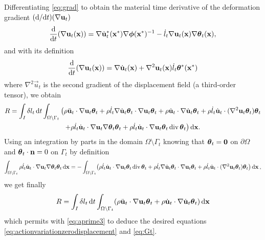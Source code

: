 Differentiating \eqref{eq:grad} to obtain the material time derivative of the deformation gradient $(\md/\md t)(\nabla\vec{u}_t)$
\[
\frac{\md}{\md t}(\nabla\vec{u}_t(\vec{x}))=\nabla\dot{\vec{u}}_t^*(\vec{x}^*)\nabla\philt(\vec{x}^*)^{-1}-\dot{l}_t\nabla\vec{u}_t(\vec{x})\nabla\vtheta_t(\vec{x}),
\]
and with its definition
\[
\frac{\md}{\md t}(\nabla\vec{u}_t(\vec{x}))=\nabla\dot{\vec{u}}_t(\vec{x})+\nabla^2\vec{u}_t(\vec{x})\dot{l}_t\vtheta^*(\vec{x}^*)
\]
where $\nabla^2\vec{u}_t$ is the second gradient of the displacement field (a third-order tensor), we obtain
\begin{multline*}
R=\int_I\delta l_t\D{t}\int_\domaint\big(\rho\ddot{\vec{u}}_t\cdot\nabla\vec{u}_t\vtheta_t+\rho\dot{l}_t\nabla\dot{\vec{u}}_t\vtheta_t\cdot\nabla\vec{u}_t\vtheta_t+\rho\dot{\vec{u}}_t\cdot\nabla\dot{\vec{u}}_t\vtheta_t+\rho\dot{l}_t\dot{\vec{u}}_t\cdot(\nabla^2\vec{u}_t\vtheta_t)\vtheta_t  \\
+\rho\dot{l}_t\dot{\vec{u}}_t\cdot\nabla\vec{u}_t\nabla\vtheta_t\vtheta_t+\rho\dot{l}_t\dot{\vec{u}}_t\cdot\nabla\vec{u}_t\vtheta_t\div\vtheta_t\big)\dx.
\end{multline*}
Using an integration by parts in the domain $\Omega\setminus\Gamma_t$ knowing that $\vtheta_t=\vec{0}$ on $\partial\Omega$ and $\vtheta_t\cdot\vec{n}=0$ on $\Gamma_t$ by definition
\[
\int_\domaint\rho\dot{l}_t\dot{\vec{u}}_t\cdot\nabla\vec{u}_t\nabla\vtheta_t\vtheta_t\dx=-\int_\domaint\bigl(\rho\dot{l}_t\dot{\vec{u}}_t\cdot\nabla\vec{u}_t\vtheta_t\div\vtheta_t+\rho\dot{l}_t\nabla\dot{\vec{u}}_t\vtheta_t\cdot\nabla\vec{u}_t\vtheta_t+\rho\dot{l}_t\dot{\vec{u}}_t\cdot(\nabla^2\vec{u}_t\vtheta_t)\vtheta_t\bigr)\dx\,,
\]
we get finally
\[
R=\int_I\delta l_t\D{t}\int_\domaint(\rho\ddot{\vec{u}}_t\cdot\nabla\vec{u}_t\vtheta_t+\rho\dot{\vec{u}}_t\cdot\nabla\dot{\vec{u}}_t\vtheta_t)\dx
\]
which permits with \eqref{eq:aprime3} to deduce the desired equations \eqref{eq:actionvariationzerodisplacement} and \eqref{eq:Gt}.

